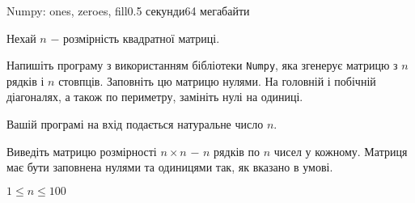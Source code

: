 \begin{problem}{Numpy: ones, zeroes, fill}{}{}{0.5 секунди}{64 мегабайти}

Нехай $n$ $-$ розмірність квадратної матриці.

Напишіть програму з використанням бібліотеки \texttt{Numpy}, яка згенерує матрицю з $n$ рядків і $n$ стовпців.
Заповніть цю матрицю нулями. На головній і побічній діагоналях, а також по периметру, замініть нулі на одиниці.

\InputFile
Вашій програмі на вхід подається натуральне число $n$.

\OutputFile
Виведіть матрицю розмірності $n \times n$ $-$ $n$ рядків по $n$ чисел у кожному. 
Матриця має бути заповнена нулями та одиницями так, як вказано в умові.

\Constraints
$1 \le n \le 100$

\Examples
\begin{example}
%
%
\end{example}

\end{problem}

